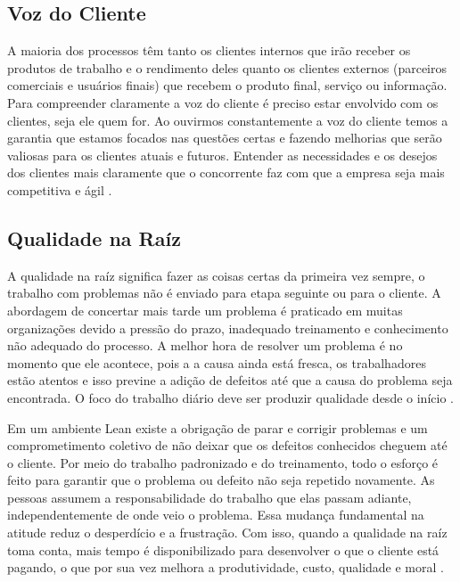 \begin{anexosenv}
\subsection[Voz do Cliente]{Voz do Cliente}

A maioria dos processos têm tanto os clientes internos que irão receber os produtos de trabalho e o rendimento deles quanto os clientes externos (parceiros comerciais e usuários finais) que recebem o produto final, serviço ou informação. Para compreender claramente a voz do cliente é preciso estar envolvido com os clientes, seja ele quem for. Ao ouvirmos constantemente a voz do cliente temos a garantia que estamos focados nas questões certas e fazendo melhorias que serão valiosas para os clientes atuais e futuros. Entender as necessidades e os desejos dos clientes mais claramente que o concorrente faz com que a empresa seja mais competitiva e ágil \cite{bell2011}.

\subsection[Qualidade na Raíz]{Qualidade na Raíz}

A qualidade na raíz significa fazer as coisas certas da primeira vez sempre, o trabalho com problemas não é enviado para etapa seguinte ou para o cliente. A abordagem de concertar mais tarde um problema é praticado em muitas organizações devido a pressão do prazo, inadequado treinamento e conhecimento não adequado do processo.  A melhor hora de resolver um problema é no momento que ele acontece, pois a a causa ainda está fresca, os trabalhadores estão atentos e isso previne a adição de defeitos até que a causa do problema seja encontrada.  O foco do trabalho diário deve ser produzir qualidade desde o início \cite{bell2011}.

Em um ambiente Lean existe a obrigação de parar e corrigir problemas e um comprometimento coletivo de não deixar que os defeitos conhecidos cheguem até o cliente. Por meio do trabalho padronizado e do treinamento, todo o esforço é feito para garantir que o problema ou defeito não seja repetido novamente. As pessoas assumem a responsabilidade do trabalho que elas passam adiante, independentemente de onde veio o problema. Essa mudança fundamental na atitude reduz o desperdício e a frustração. Com isso, quando a qualidade na raíz toma conta, mais tempo é disponibilizado para desenvolver o que o cliente está pagando, o que por sua vez melhora a produtividade, custo, qualidade e moral \cite{bell2011}.


\end{anexosenv}
